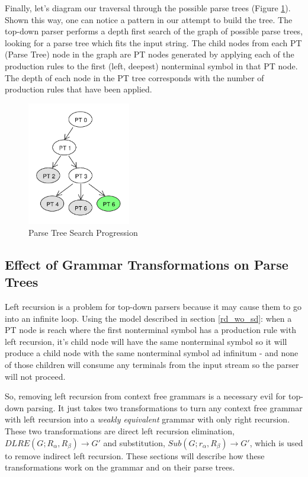 \documentclass[11pt]{article}
\begin{document}
Finally, let's diagram our traversal through the possible parse trees (Figure \ref{fig:rdp_7}). Shown this way, one can notice
a pattern in our attempt to build the tree. The top-down parser performs a depth first search of the 
graph of possible parse trees, looking for a parse tree which fits the input string.
The child nodes from each PT (Parse Tree) node in the graph are PT nodes generated by
applying each of the production rules to the first (left, deepest) nonterminal symbol in that PT node.
The depth of each node in the PT tree corresponds with the number of production rules that have been applied.

\begin{figure}[h!]
    \centering
    \includegraphics[width=0.4\textwidth,natwidth=30,natheight=30]{umlet/rdp_7.pdf}
    \caption{Parse Tree Search Progression}
    \label{fig:rdp_7}
\end{figure}

\clearpage

\subsection{Effect of Grammar Transformations on Parse Trees}
Left recursion is a problem for top-down parsers because it may cause them to
go into an infinite loop. Using the model described in section \ref{rd_wo_sd}:
when a PT node is reach where the first nonterminal symbol has a production rule with
left recursion, it's child node will have the same nonterminal symbol so it will produce
a child node with the same nonterminal symbol ad infinitum - and none of those children will
consume any terminals from the input stream so the parser will not proceed. 

So, removing left recursion from context free grammars is a necessary evil for top-down parsing.
It just takes two transformations to turn any context free grammar with left recursion
into a {\em weakly equivalent} grammar with only right recursion.
These two transformations are direct left recursion elimination, 
$DLRE(G; R_\alpha, R_\beta) \rightarrow G'$ and substitution, 
$Sub(G; r_\alpha, R_\beta) \rightarrow G'$, which is used to
remove indirect left recursion. \cite{aho, lewis}
These sections will describe how these transformations work on the grammar
and on their parse trees.
\end{document}
